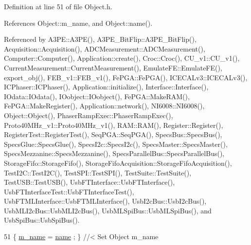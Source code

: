 Definition at line 51 of file Object.\+h.



References Object\+::m\+\_\+name, and Object\+::name().



Referenced by A3\+P\+E\+::\+A3\+P\+E(), A3\+P\+E\+\_\+\+Bit\+Flip\+::\+A3\+P\+E\+\_\+\+Bit\+Flip(), Acquisition\+::\+Acquisition(), A\+D\+C\+Measurement\+::\+A\+D\+C\+Measurement(), Computer\+::\+Computer(), Application\+::create(), Croc\+::\+Croc(), C\+U\+\_\+v1\+::\+C\+U\+\_\+v1(), Current\+Measurement\+::\+Current\+Measurement(), Emulate\+F\+E\+::\+Emulate\+F\+E(), export\+\_\+obj(), F\+E\+B\+\_\+v1\+::\+F\+E\+B\+\_\+v1(), Fe\+P\+G\+A\+::\+Fe\+P\+G\+A(), I\+C\+E\+C\+A\+Lv3\+::\+I\+C\+E\+C\+A\+Lv3(), I\+C\+Phaser\+::\+I\+C\+Phaser(), Application\+::initialize(), Interface\+::\+Interface(), I\+Odata\+::\+I\+Odata(), I\+Oobject\+::\+I\+Oobject(), Fe\+P\+G\+A\+::\+Make\+R\+A\+M(), Fe\+P\+G\+A\+::\+Make\+Register(), Application\+::network(), N\+I6008\+::\+N\+I6008(), Object\+::\+Object(), Phaser\+Ramp\+Exec\+::\+Phaser\+Ramp\+Exec(), Proto40\+M\+Hz\+\_\+v1\+::\+Proto40\+M\+Hz\+\_\+v1(), R\+A\+M\+::\+R\+A\+M(), Register\+::\+Register(), Register\+Test\+::\+Register\+Test(), Seq\+P\+G\+A\+::\+Seq\+P\+G\+A(), Specs\+Bus\+::\+Specs\+Bus(), Specs\+Glue\+::\+Specs\+Glue(), Specs\+I2c\+::\+Specs\+I2c(), Specs\+Master\+::\+Specs\+Master(), Specs\+Mezzanine\+::\+Specs\+Mezzanine(), Specs\+Parallel\+Bus\+::\+Specs\+Parallel\+Bus(), Storage\+Fifo\+::\+Storage\+Fifo(), Storage\+Fifo\+Acquisition\+::\+Storage\+Fifo\+Acquisition(), Test\+I2\+C\+::\+Test\+I2\+C(), Test\+S\+P\+I\+::\+Test\+S\+P\+I(), Test\+Suite\+::\+Test\+Suite(), Test\+U\+S\+B\+::\+Test\+U\+S\+B(), Usb\+F\+T\+Interface\+::\+Usb\+F\+T\+Interface(), Usb\+F\+T\+Interface\+Test\+::\+Usb\+F\+T\+Interface\+Test(), Usb\+F\+T\+M\+L\+Interface\+::\+Usb\+F\+T\+M\+L\+Interface(), Usb\+I2c\+Bus\+::\+Usb\+I2c\+Bus(), Usb\+M\+L\+I2c\+Bus\+::\+Usb\+M\+L\+I2c\+Bus(), Usb\+M\+L\+Spi\+Bus\+::\+Usb\+M\+L\+Spi\+Bus(), and Usb\+Spi\+Bus\+::\+Usb\+Spi\+Bus().


\begin{DoxyCode}
51 \{ \hyperlink{classObject_a8b83c95c705d2c3ba0d081fe1710f48d}{m\_name}  = \hyperlink{classObject_a300f4c05dd468c7bb8b3c968868443c1}{name}  ; \} \textcolor{comment}{//< Set Object m\_name}
\end{DoxyCode}
\mbox{\label{classObject_a89557dbbad5bcaa02652f5d7fa35d20f}} 
